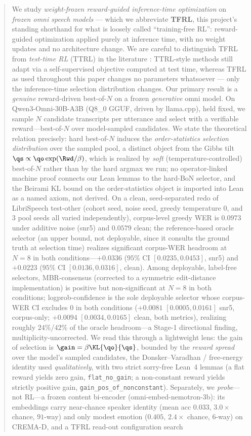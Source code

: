 \begin{abstract}
We study \emph{weight-frozen reward-guided inference-time optimization} on \emph{frozen omni speech models} --- which we abbreviate \textbf{TFRL}, this project's standing shorthand for what is loosely called ``training-free RL'': reward-guided optimization applied purely at inference time, with no weight updates and no architecture change. We are careful to distinguish TFRL from \emph{test-time RL} (TTRL) in the literature \citep{zuo2025ttrl}: TTRL-style methods still adapt via a self-supervised objective computed at test time, whereas TFRL as used throughout this paper changes no parameters whatsoever --- only the inference-time selection distribution changes. Our primary result is a \emph{genuine} reward-driven best-of-$N$ on a frozen \emph{generative} omni model. On Qwen3-Omni-30B-A3B (Q8\_0 GGUF, driven by llama.cpp), held fixed, we sample $N$ candidate transcripts per utterance and select with a verifiable reward---best-of-$N$ over model-sampled candidates. We state the theoretical relation precisely: hard best-of-$N$ induces the \emph{order-statistics selection distribution} over the sampled pool, a distinct object from the Gibbs tilt $\qs\propto\qo\exp(\Rwd/\beta)$, which is realized by \emph{soft} (temperature-controlled) best-of-$N$ rather than by the hard argmax we run; no operator-linked machine proof connects our Lean lemmas to the hard-BoN selector, and the Beirami KL bound on the order-statistics object is imported into Lean as a named axiom, not derived. On a clean, seed-separated redo of LibriSpeech test-other (cohort seed, noise seed, greedy temperature $0$, and $3$ pool seeds all varied independently), corpus-level greedy WER is $0.0973$ under additive noise (snr5) and $0.0579$ clean; the reference-based oracle selector (an upper bound, not deployable, since it consults the ground truth at selection time) realizes significant corpus-WER headroom at $N=8$ in both conditions---$+0.0336$ ($95\%$ CI $[0.0235,0.0453]$, snr5) and $+0.0223$ ($95\%$ CI $[0.0136,0.0316]$, clean). Among deployable, label-free selectors, MBR-consensus (corrected to a symmetric edit-distance implementation) is positive but non-significant at $N=8$ in both conditions; logprob-confidence is the sole deployable selector whose corpus-WER CI excludes $0$ in both conditions ($+0.0081$ $[0.0005,0.0161]$ snr5, corpus-only; $+0.0094$ $[0.0034,0.0165]$ clean, both metrics), realizing roughly $24\%$/$42\%$ of the oracle headroom---a Stage-1 directional finding, multiplicity-uncorrected. We read this through a lightweight lens: the gain of selection is $\gain=\beta\KL{\qo}{\qs}$, bounded by the \emph{reward spread} over the model's sampled candidates, the Donsker--Varadhan / free-energy identity used \emph{qualitatively}, with two strict sorry-free Lean~4 lemmas (a flat reward yields zero gain, \texttt{flat\_no\_gain}; a non-constant reward yields strictly positive gain, \texttt{gain\_pos\_of\_nonconstant}). Separately, we \emph{probe}---not RL---a frozen content bi-encoder (omni-embed-nemotron-3b): its embeddings carry near-chance speaker identity (mean acc $0.033$, $3.0\times$ chance, $91$-way) and only modest emotion ($0.405$, $2.4\times$ chance, $6$-way) on CREMA-D, and a TFRL read-out configuration search 
\end{abstract}
